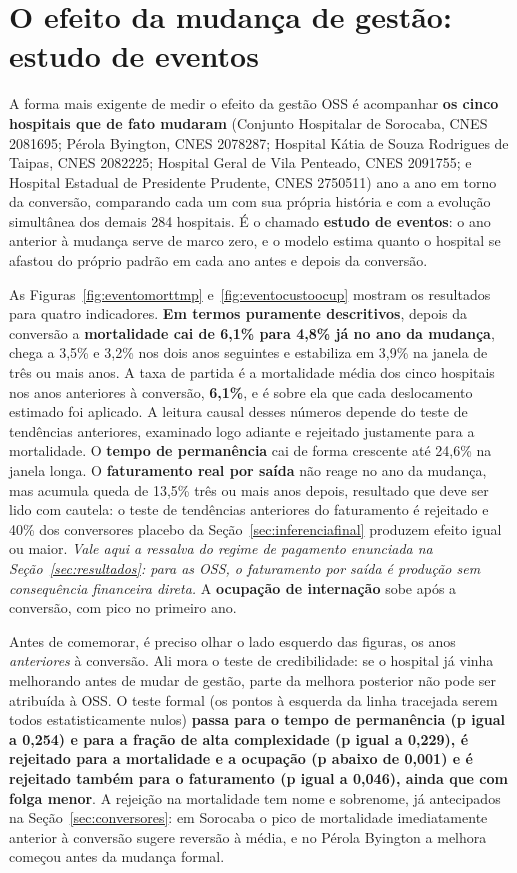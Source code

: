 \section{O efeito da mudança de gestão: estudo de eventos}
\label{sec:efeitogestao}

A forma mais exigente de medir o efeito da gestão OSS é acompanhar
\textbf{os cinco hospitais que de fato mudaram} (Conjunto Hospitalar de
Sorocaba, CNES 2081695; Pérola Byington, CNES 2078287; Hospital Kátia
de Souza Rodrigues de Taipas, CNES 2082225; Hospital Geral de Vila
Penteado, CNES 2091755; e Hospital Estadual de Presidente Prudente,
CNES 2750511) ano a ano em torno da conversão, comparando cada um com
sua própria história e com a evolução simultânea dos demais 284
hospitais. É o chamado \textbf{estudo de eventos}: o ano anterior à
mudança serve de marco zero, e o modelo estima quanto o hospital se
afastou do próprio padrão em cada ano antes e depois da conversão.

As Figuras~\ref{fig:eventomorttmp} e~\ref{fig:eventocustoocup} mostram
os resultados para quatro indicadores. \textbf{Em termos puramente
descritivos}, depois da conversão a
\textbf{mortalidade cai de 6,1\% para 4,8\% já no ano da mudança},
chega a 3,5\% e 3,2\% nos dois anos seguintes e estabiliza em 3,9\% na
janela de três ou mais anos. A taxa de partida é a mortalidade média dos
cinco hospitais nos anos anteriores à conversão, \textbf{6,1\%}, e é sobre
ela que cada deslocamento estimado foi aplicado. A leitura causal desses
números depende do teste de tendências anteriores, examinado logo
adiante e rejeitado justamente para a mortalidade. O \textbf{tempo de
permanência} cai de forma crescente até 24,6\% na janela longa. O
\textbf{faturamento real por saída} não reage no ano da mudança, mas acumula
queda de 13,5\% três ou mais anos depois, resultado que deve ser lido
com cautela: o teste de tendências anteriores do faturamento é rejeitado e
40\% dos conversores placebo da Seção~\ref{sec:inferenciafinal}
produzem efeito igual ou maior. \textit{Vale aqui a ressalva do regime
de pagamento enunciada na Seção~\ref{sec:resultados}: para as OSS, o
faturamento por saída é produção sem consequência financeira direta.} A \textbf{ocupação de
internação} sobe após a conversão, com pico no primeiro ano.

Antes de comemorar, é preciso olhar o lado esquerdo das figuras, os
anos \emph{anteriores} à conversão. Ali mora o teste de credibilidade:
se o hospital já vinha melhorando antes de mudar de gestão, parte da
melhora posterior não pode ser atribuída à OSS. O teste formal (os
pontos à esquerda da linha tracejada serem todos estatisticamente
nulos) \textbf{passa para o tempo de permanência (p igual a 0,254) e
para a fração de alta complexidade (p igual a 0,229), é rejeitado para
a mortalidade e a ocupação (p abaixo de 0,001) e é rejeitado também
para o faturamento (p igual a 0,046), ainda que com folga menor}. A rejeição na mortalidade tem nome e
sobrenome, já antecipados na Seção~\ref{sec:conversores}: em Sorocaba
o pico de mortalidade imediatamente anterior à conversão sugere
reversão à média, e no Pérola Byington a melhora começou antes da
mudança formal.

